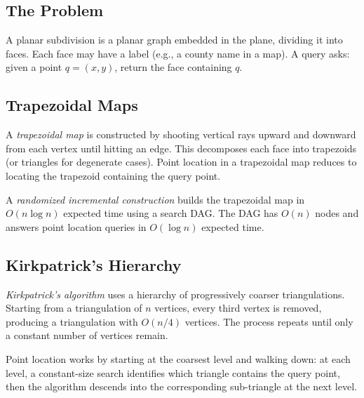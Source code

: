 \subsection{The Problem}

A planar subdivision is a planar graph embedded in the plane, dividing it into faces. Each face may have a label (e.g., a county name in a map). A query asks: given a point $q = (x, y)$, return the face containing $q$.

\subsection{Trapezoidal Maps}

A \emph{trapezoidal map} is constructed by shooting vertical rays upward and downward from each vertex until hitting an edge. This decomposes each face into trapezoids (or triangles for degenerate cases). Point location in a trapezoidal map reduces to locating the trapezoid containing the query point.

A \emph{randomized incremental construction} builds the trapezoidal map in $O(n \log n)$ expected time using a search DAG. The DAG has $O(n)$ nodes and answers point location queries in $O(\log n)$ expected time.

\subsection{Kirkpatrick's Hierarchy}

\emph{Kirkpatrick's algorithm} uses a hierarchy of progressively coarser triangulations. Starting from a triangulation of $n$ vertices, every third vertex is removed, producing a triangulation with $O(n/4)$ vertices. The process repeats until only a constant number of vertices remain.

Point location works by starting at the coarsest level and walking down: at each level, a constant-size search identifies which triangle contains the query point, then the algorithm descends into the corresponding sub-triangle at the next level.

